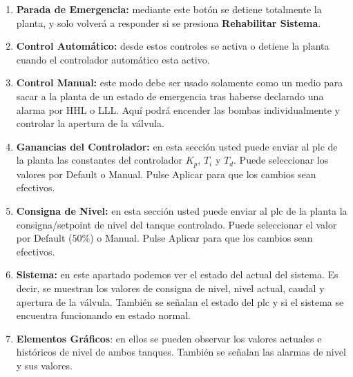 \begin{enumerate}
\item \textbf{Parada de Emergencia:} mediante este botón se detiene totalmente
la planta, y solo volverá a responder si se presiona \textbf{Rehabilitar
Sistema}.
 \item \textbf{Control Automático:} desde estos controles se activa o detiene
la planta cuando el controlador automático esta activo.
 \item \textbf{Control Manual:} este modo debe ser usado solamente como un
medio para
sacar a la planta de un estado de emergencia tras  haberse declarado una alarma
por HHL o LLL.
Aquí podrá encender las bombas individualmente y controlar la apertura de la
válvula.
 \item \textbf{Ganancias del Controlador:} en esta sección usted puede enviar al
\gls{plc} de la planta las constantes del controlador $K_p$, $T_i$ y $T_d$. 
Puede seleccionar los valores por Default o Manual. Pulse Aplicar para que los
cambios sean efectivos.
 \item \textbf{Consigna de Nivel:} en esta sección usted puede enviar al
\gls{plc} de la planta la consigna/setpoint de nivel del tanque controlado. 
Puede seleccionar el valor por Default ($50\%$) o Manual. Pulse Aplicar para
que
los cambios sean efectivos.
 \item \textbf{Sistema:} en este apartado podemos ver el estado del actual del
sistema. Es decir, se muestran los valores de consigna de nivel, nivel
actual, caudal y apertura de la válvula. También se señalan el estado del 
\gls{plc} y si el sistema se encuentra funcionando en estado normal.
\item \textbf{Elementos Gráficos}: en ellos se pueden observar los valores
actuales e
históricos de nivel de ambos tanques. También se señalan las alarmas de nivel y
sus valores.
\end{enumerate}
